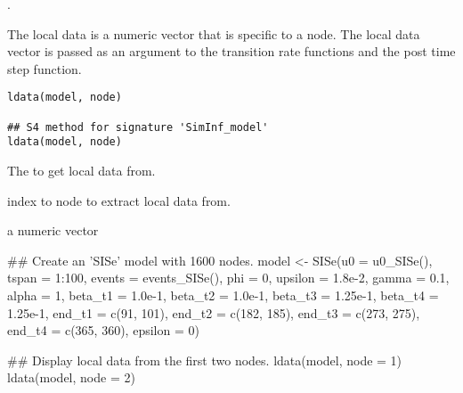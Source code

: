 \documentclass[letterpaper]{book}
\begin{document}
%
\begin{Value}
\end{Value}
%
\begin{SeeAlso}
.
\end{SeeAlso}
%
\begin{Description}
The local data is a numeric vector that is specific to a node.
The local data vector is passed as an argument to the transition
rate functions and the post time step function.
\end{Description}
%
\begin{Usage}
\begin{verbatim}
ldata(model, node)

## S4 method for signature 'SimInf_model'
ldata(model, node)
\end{verbatim}
\end{Usage}
%
\begin{Arguments}
\begin{ldescription}
\item[\code{model}] The  to get local data from.

\item[\code{node}] index to node to extract local data from.
\end{ldescription}
\end{Arguments}
%
\begin{Value}
a numeric vector
\end{Value}
%
\begin{Examples}
\begin{ExampleCode}
## Create an 'SISe' model with 1600 nodes.
model <- SISe(u0 = u0_SISe(), tspan = 1:100, events = events_SISe(),
              phi = 0, upsilon = 1.8e-2, gamma = 0.1, alpha = 1,
              beta_t1 = 1.0e-1, beta_t2 = 1.0e-1, beta_t3 = 1.25e-1,
              beta_t4 = 1.25e-1, end_t1 = c(91, 101), end_t2 = c(182, 185),
              end_t3 = c(273, 275), end_t4 = c(365, 360), epsilon = 0)

## Display local data from the first two nodes.
ldata(model, node = 1)
ldata(model, node = 2)
\end{ExampleCode}
\end{Examples}
\end{document}
